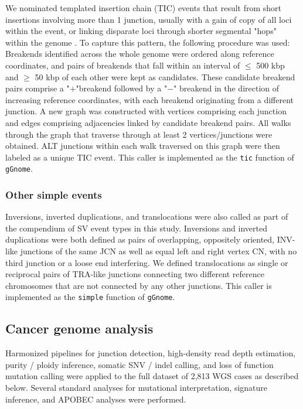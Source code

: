\documentclass[phd,tocprelim]{cornell}
\newcommand{\ttt}[1]{\texttt{#1}}
\begin{document}
We nominated templated insertion chain (TIC) events that result from short insertions involving more than 1 junction, usually with a gain of copy of all loci within the event, or linking disparate loci through shorter segmental "hops" within the genome \cite{Li2020sv}. To capture this pattern, the following procedure was used: Breakends identified across the whole genome were ordered along reference coordinates, and pairs of breakends that fall within an interval of $\le$ 500 kbp and $\ge$ 50 kbp of each other were kept as candidates. These candidate breakend pairs comprise a "$+$"breakend followed by a "$-$" breakend in the direction of increasing reference coordinates, with each breakend originating from a different junction. A new graph was constructed with vertices comprising each junction and edges comprising adjacencies linked by candidate breakend pairs. All walks through the graph that traverse through at least 2 vertices/junctions were obtained. ALT junctions within each  walk traversed on this graph were then labeled as a unique TIC event.  This caller is implemented as the \ttt{tic} function of \ttt{gGnome}.



\subsubsection*{Other simple events}

Inversions, inverted duplications, and translocations were also called as part of the compendium of SV event types in this study. Inversions and inverted duplications were both defined as pairs of overlapping, oppositely oriented, INV-like junctions of the same JCN as well as equal left and right vertex CN, with no third junction or a loose end interfering. We defined translocations as single or reciprocal pairs of TRA-like junctions connecting two different reference chromosomes that are not connected by any other junctions.  This caller is implemented as the \ttt{simple} function of \ttt{gGnome}.

\subsection*{Cancer genome analysis} Harmonized pipelines for junction detection, high-density read depth estimation, purity / ploidy inference, somatic SNV / indel calling, and loss of function mutation calling were applied to the full dataset of 2,813 WGS cases as described below. Several standard analyses for mutational interpretation, signature inference, and APOBEC analyses were performed.
\end{document}

